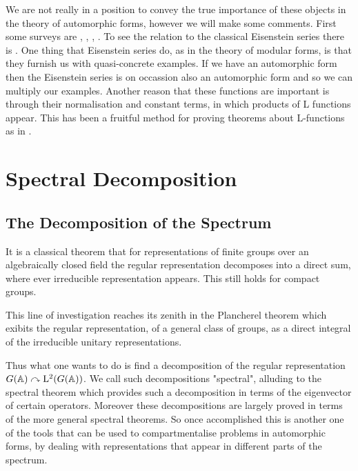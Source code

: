 We are not really in a position to convey the true importance of these objects in the theory of automorphic forms, however we will make some comments. First some surveys are \cite{lapidPerspectivesEisensteinSeries2022}, \cite{arthurEisensteinSeriesTrace1979}, \cite{kimEISENSTEINSERIESTHEIR}, \cite{jiangResiduesEisensteinSeries2008a}. To see the relation to the classical Eisenstein series there is \cite{garrettTransitionEisensteinSeries2016}. One thing that Eisenstein series do, as in the theory of modular forms, is that they furnish us with quasi-concrete examples. If we have an automorphic form then the Eisenstein series is on occassion also an automorphic form and so we can multiply our examples. Another reason that these functions are important is through their normalisation and constant terms, in which products of L functions appear. This has been a fruitful method for proving theorems about L-functions as in \cite{shahidiEisensteinSeriesAutomorphic2010}\cite{pollackRANKINSELBERGMETHODUSER}\cite{arthurEisensteinSeriesTrace1979}.

\section{Spectral Decomposition}\label{spectral_decomposition}
\subsection{The Decomposition of the Spectrum}
It is a classical theorem that for representations of finite groups over an algebraically closed field the regular representation decomposes into a direct sum, where ever irreducible representation appears. This still holds for compact groups. \cite[5.1]{follandCourseAbstractHarmonic2016}

\begin{example}
    
\end{example}

This line of investigation reaches its zenith in the Plancherel theorem \cite[7.44]{follandCourseAbstractHarmonic2016} which exibits the regular representation, of a general class of groups, as a direct integral of the irreducible unitary representations. 


Thus what one wants to do is find a decomposition of the regular representation \(G(\A) \curvearrowright \mathrm{L}^2(G(\A))\).
We call such decompositions "spectral", alluding to the spectral theorem which provides such a decomposition in terms of the eigenvector of certain operators. Moreover these decompositions are largely proved in terms of the more general spectral theorems. So once accomplished this is another one of the tools that can be used to compartmentalise problems in automorphic forms, by dealing with representations that appear in different parts of the spectrum. 


